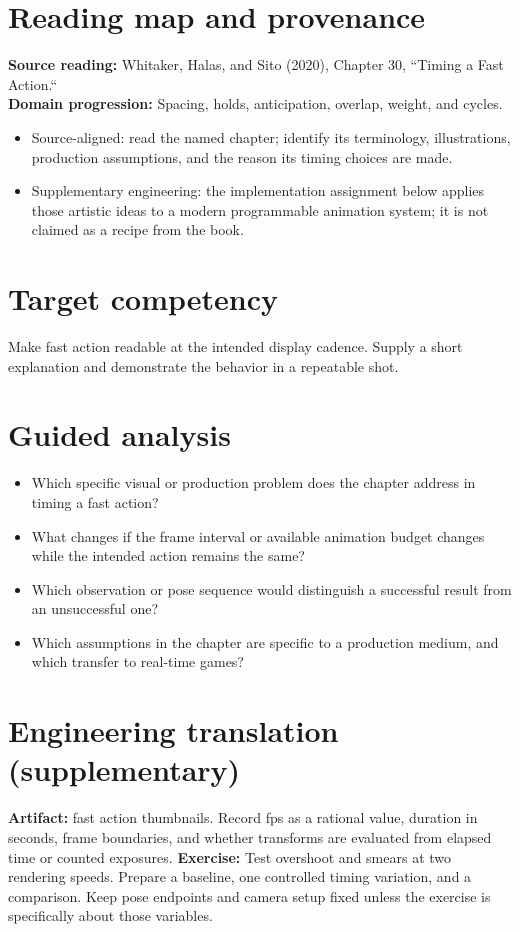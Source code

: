 \documentclass[10pt,letterpaper]{article}
\begin{document}
\makedoctitle
\makedocsummary

\section{Reading map and provenance}
\textbf{Source reading:} Whitaker, Halas, and Sito (2020), Chapter 30, ``Timing a Fast Action.``\\
\textbf{Domain progression:} Spacing, holds, anticipation, overlap, weight, and cycles.
\begin{itemize}
\item Source-aligned: read the named chapter; identify its terminology, illustrations, production assumptions, and the reason its timing choices are made.
\item Supplementary engineering: the implementation assignment below applies those artistic ideas to a modern programmable animation system; it is not claimed as a recipe from the book.
\end{itemize}
\section{Target competency}
Make fast action readable at the intended display cadence. Supply a short explanation and demonstrate the behavior in a repeatable shot.
\section{Guided analysis}
\begin{itemize}
\item Which specific visual or production problem does the chapter address in timing a fast action?
\item What changes if the frame interval or available animation budget changes while the intended action remains the same?
\item Which observation or pose sequence would distinguish a successful result from an unsuccessful one?
\item Which assumptions in the chapter are specific to a production medium, and which transfer to real-time games?
\end{itemize}
\section{Engineering translation (supplementary)}
\textbf{Artifact:} fast action thumbnails. Record fps as a rational value, duration in seconds, frame boundaries, and whether transforms are evaluated from elapsed time or counted exposures.
\textbf{Exercise:} Test overshoot and smears at two rendering speeds. Prepare a baseline, one controlled timing variation, and a comparison. Keep pose endpoints and camera setup fixed unless the exercise is specifically about those variables.
\end{document}

